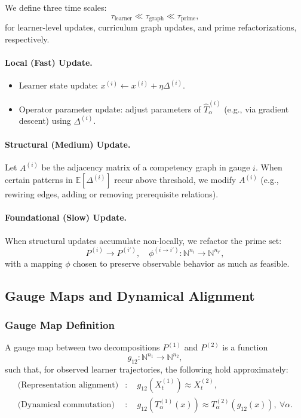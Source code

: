 \documentclass[11pt]{article}
\begin{document}
We define three time scales:
\[
\tau_{\text{learner}} \ll \tau_{\text{graph}} \ll \tau_{\text{prime}},
\]
for learner-level updates, curriculum graph updates, and prime refactorizations, respectively.

\paragraph{Local (Fast) Update.}
\begin{itemize}[itemsep=3pt]
  \item Learner state update: $x^{(i)} \leftarrow x^{(i)} + \eta \Delta^{(i)}$.
  \item Operator parameter update: adjust parameters of $\hat{T}^{(i)}_\alpha$ (e.g., via gradient descent) using $\Delta^{(i)}$.
\end{itemize}

\paragraph{Structural (Medium) Update.}

Let $A^{(i)}$ be the adjacency matrix of a competency graph in gauge $i$. When certain patterns in $\mathbb{E}[\Delta^{(i)}]$ recur above threshold, we modify $A^{(i)}$ (e.g., rewiring edges, adding or removing prerequisite relations).

\paragraph{Foundational (Slow) Update.}

When structural updates accumulate non-locally, we refactor the prime set:
\[
P^{(i)} \to P^{(i')}, \quad \phi^{(i\to i')}: \mathbb{N}^{n_i} \to \mathbb{N}^{n_{i'}},
\]
with a mapping $\phi$ chosen to preserve observable behavior as much as feasible.

\subsection{Gauge Maps and Dynamical Alignment}

\subsubsection{Gauge Map Definition}

\begin{definition}
A gauge map between two decompositions $P^{(1)}$ and $P^{(2)}$ is a function
\[
g_{12}: \mathbb{N}^{n_1} \to \mathbb{N}^{n_2},
\]
such that, for observed learner trajectories, the following hold approximately:
\begin{align*}
\text{(Representation alignment)} &:\quad g_{12}\left(X^{(1)}_t\right) \approx X^{(2)}_t, \\
\text{(Dynamical commutation)} &:\quad g_{12}\left(T^{(1)}_\alpha(x)\right) \approx T^{(2)}_\alpha\left(g_{12}(x)\right), \ \forall \alpha.
\end{align*}
\end{definition}
\end{document}
